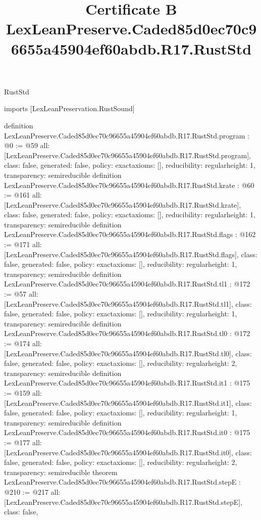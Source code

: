 \begin{lexlean}{RustStd}
\title{Certificate B LexLeanPreserve.Caded85d0ec70c96655a45904ef60abdb.R17.RustStd}
\begin{coremodule}
imports [LexLeanPreservation.RustSound]

definition LexLeanPreserve.Caded85d0ec70c96655a45904ef60abdb.R17.RustStd.program : @0 := @59 {
  all: [LexLeanPreserve.Caded85d0ec70c96655a45904ef60abdb.R17.RustStd.program],
  class: false,
  generated: false,
  policy: exact{axioms: []},
  reducibility: regular{height: 1},
  transparency: semireducible
}
definition LexLeanPreserve.Caded85d0ec70c96655a45904ef60abdb.R17.RustStd.krate : @60 := @161 {
  all: [LexLeanPreserve.Caded85d0ec70c96655a45904ef60abdb.R17.RustStd.krate],
  class: false,
  generated: false,
  policy: exact{axioms: []},
  reducibility: regular{height: 1},
  transparency: semireducible
}
definition LexLeanPreserve.Caded85d0ec70c96655a45904ef60abdb.R17.RustStd.flags : @162 := @171 {
  all: [LexLeanPreserve.Caded85d0ec70c96655a45904ef60abdb.R17.RustStd.flags],
  class: false,
  generated: false,
  policy: exact{axioms: []},
  reducibility: regular{height: 1},
  transparency: semireducible
}
definition LexLeanPreserve.Caded85d0ec70c96655a45904ef60abdb.R17.RustStd.tl1 : @172 := @57 {
  all: [LexLeanPreserve.Caded85d0ec70c96655a45904ef60abdb.R17.RustStd.tl1],
  class: false,
  generated: false,
  policy: exact{axioms: []},
  reducibility: regular{height: 1},
  transparency: semireducible
}
definition LexLeanPreserve.Caded85d0ec70c96655a45904ef60abdb.R17.RustStd.tl0 : @172 := @174 {
  all: [LexLeanPreserve.Caded85d0ec70c96655a45904ef60abdb.R17.RustStd.tl0],
  class: false,
  generated: false,
  policy: exact{axioms: []},
  reducibility: regular{height: 2},
  transparency: semireducible
}
definition LexLeanPreserve.Caded85d0ec70c96655a45904ef60abdb.R17.RustStd.it1 : @175 := @159 {
  all: [LexLeanPreserve.Caded85d0ec70c96655a45904ef60abdb.R17.RustStd.it1],
  class: false,
  generated: false,
  policy: exact{axioms: []},
  reducibility: regular{height: 1},
  transparency: semireducible
}
definition LexLeanPreserve.Caded85d0ec70c96655a45904ef60abdb.R17.RustStd.it0 : @175 := @177 {
  all: [LexLeanPreserve.Caded85d0ec70c96655a45904ef60abdb.R17.RustStd.it0],
  class: false,
  generated: false,
  policy: exact{axioms: []},
  reducibility: regular{height: 2},
  transparency: semireducible
}
theorem LexLeanPreserve.Caded85d0ec70c96655a45904ef60abdb.R17.RustStd.stepE : @210 := @217 {
  all: [LexLeanPreserve.Caded85d0ec70c96655a45904ef60abdb.R17.RustStd.stepE],
  class: false,
}
\end{coremodule}
\end{lexlean}
